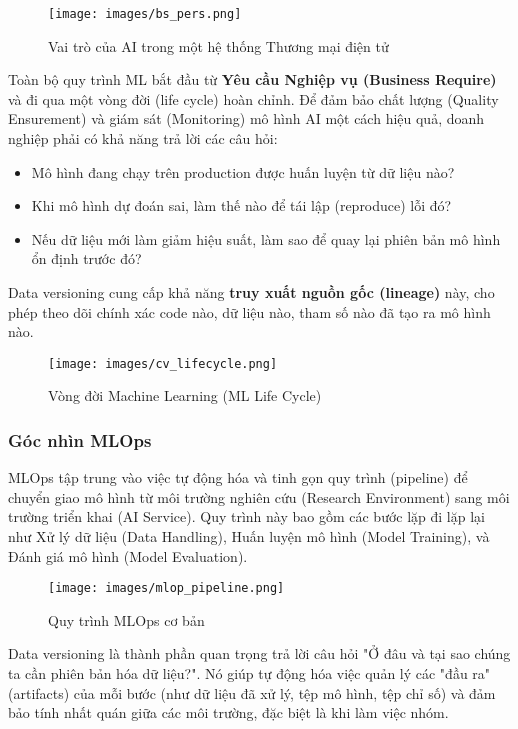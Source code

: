 \documentclass[11pt]{article}
\begin{document}
\begin{figure}[H]
    \centering
    \texttt{[image: images/bs\_pers.png]}
    \caption{Vai trò của AI trong một hệ thống Thương mại điện tử}
\end{figure}

Toàn bộ quy trình ML bắt đầu từ \textbf{Yêu cầu Nghiệp vụ (Business Require)} và đi qua một vòng đời (life cycle) hoàn chỉnh. Để đảm bảo chất lượng (Quality Ensurement) và giám sát (Monitoring) mô hình AI một cách hiệu quả, doanh nghiệp phải có khả năng trả lời các câu hỏi:
\begin{itemize}
    \item Mô hình đang chạy trên production được huấn luyện từ dữ liệu nào?
    \item Khi mô hình dự đoán sai, làm thế nào để tái lập (reproduce) lỗi đó?
    \item Nếu dữ liệu mới làm giảm hiệu suất, làm sao để quay lại phiên bản mô hình ổn định trước đó?
\end{itemize}
Data versioning cung cấp khả năng \textbf{truy xuất nguồn gốc (lineage)} này, cho phép theo dõi chính xác code nào, dữ liệu nào, tham số nào đã tạo ra mô hình nào.

\begin{figure}[H]
    \centering
    \texttt{[image: images/cv\_lifecycle.png]}
    \caption{Vòng đời Machine Learning (ML Life Cycle)}
\end{figure}

\subsubsection{Góc nhìn MLOps}
MLOps tập trung vào việc tự động hóa và tinh gọn quy trình (pipeline) để chuyển giao mô hình từ môi trường nghiên cứu (Research Environment) sang môi trường triển khai (AI Service). Quy trình này bao gồm các bước lặp đi lặp lại như Xử lý dữ liệu (Data Handling), Huấn luyện mô hình (Model Training), và Đánh giá mô hình (Model Evaluation).

\begin{figure}[H]
    \centering
    \texttt{[image: images/mlop\_pipeline.png]}
    \caption{Quy trình MLOps cơ bản}
\end{figure}

Data versioning là thành phần quan trọng trả lời câu hỏi "Ở đâu và tại sao chúng ta cần phiên bản hóa dữ liệu?". Nó giúp tự động hóa việc quản lý các "đầu ra" (artifacts) của mỗi bước (như dữ liệu đã xử lý, tệp mô hình, tệp chỉ số) và đảm bảo tính nhất quán giữa các môi trường, đặc biệt là khi làm việc nhóm.
\end{document}
